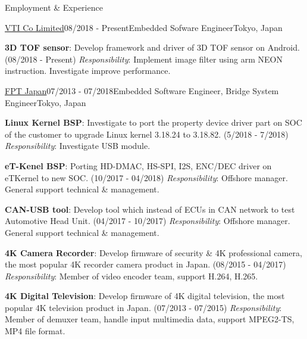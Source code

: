 \documentclass{resume}
\begin{document}
  \begin{rSection}{Employment \& Experience}
  
    \begin{rSubsection}{\href{https://www.vti.com.vn/company-vti-japan/}{\underline{VTI Co Limited}}}{08/2018 - Present}{Embedded Sofware Engineer}{Tokyo, Japan}
    \item \textbf{3D TOF sensor}: Develop framework and driver of 3D TOF sensor on Android. (08/2018 - Present)
    \newline \textit{Responsibility}: Implement image filter using arm NEON instruction. Investigate improve performance.
    \end{rSubsection}
  
    \begin{rSubsection}{\href{https://www.fpt-software.jp/company-information/fpt-japan/}{\underline{FPT Japan}}}{07/2013 - 07/2018}{Embedded Software Engineer, Bridge System Engineer}{Tokyo, Japan}
    \item \textbf{Linux Kernel BSP}: Investigate to port the property device driver part on SOC of the customer to upgrade Linux kernel 3.18.24 to 3.18.82. (5/2018 - 7/2018)
    \newline \textit{Responsibility}: Investigate USB module.

    \item \textbf{eT-Kenel BSP}: Porting HD-DMAC, HS-SPI, I2S, ENC/DEC driver on eTKernel to new SOC. (10/2017 - 04/2018)
    \newline \textit{Responsibility}: Offshore manager. General support technical \& management.

    \item \textbf{CAN-USB tool}: Develop tool which instead of ECUs in CAN network to test Automotive Head Unit. (04/2017 - 10/2017) 
    \newline \textit{Responsibility}: Offshore manager. General support technical \& management.

    \item \textbf{4K Camera Recorder}: Develop firmware of security \& 4K professional camera, the most popular 4K recorder camera product in Japan. (08/2015 - 04/2017)
    \newline \textit{Responsibility}: Member of video encoder team, support H.264, H.265.

    \item \textbf{4K Digital Television}: Develop firmware of 4K digital television, the most popular 4K television product in Japan. (07/2013 - 07/2015)
    \newline \textit{Responsibility}: Member of demuxer team, handle input multimedia data, support MPEG2-TS, MP4 file format.


\end{rSubsection}
\end{rSection}
\end{document}
